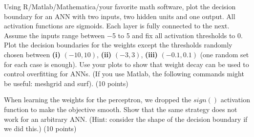 \documentclass[fleqn]{homework}
\begin{document}
  \begin{problem}{4}
    \begin{question}
      Using R/Matlab/Mathematica/your favorite math software, plot the decision
      boundary for an ANN with two inputs, two hidden units and one output. All
      activation functions are sigmoids.  Each layer is fully connected to the
      next. Assume the inputs range between −5 to 5 and fix all activation
      thresholds to 0. Plot the decision boundaries for the weights except the
      thresholds randomly chosen between \textbf{(i)} $(−10,10)$, \textbf{(ii)}
      $(−3,3)$, \textbf{(iii)} $(−0.1,0.1)$ (one random set for each case is
      enough). Use your plots to show that weight decay can be used to control
      overfitting for ANNs. (If you use Matlab, the following commands might be
      useful: meshgrid and surf). (10 points)
    \end{question}
  \end{problem}

  \begin{problem}{5}
    \begin{question}
      When learning the weights for the perceptron, we dropped the $sign()$
      activation function to make the objective smooth. Show that the same
      strategy does not work for an arbitrary ANN.  (Hint: consider the shape of
      the decision boundary if we did this.) (10 points)
    \end{question}
  \end{problem}
\end{document}
